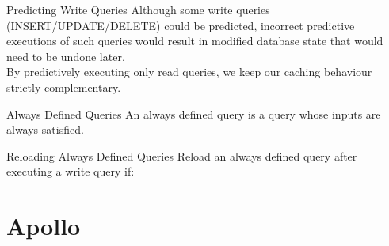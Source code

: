 \documentclass[10pt]{beamer}
\begin{document}
\begin{frame}[fragile]{Predicting Write Queries}
    Although some write queries (INSERT/UPDATE/DELETE) \alert{could} be predicted, incorrect predictive executions of such queries would result
    in modified database state that would need to be undone later.\\
    \medskip
    By predictively executing only read queries, we keep our caching behaviour \alert{strictly complementary}.
\end{frame}



\begin{frame}[fragile]{Always Defined Queries}
    An \alert{always defined query} is a query whose inputs are always satisfied.
\medskip
\end{frame}

\begin{frame}[fragile]{Reloading Always Defined Queries}
Reload an always defined query after executing a write query if:
\begin{itemize}
\end{itemize}
\end{frame}

\section{Apollo}
\end{document}
